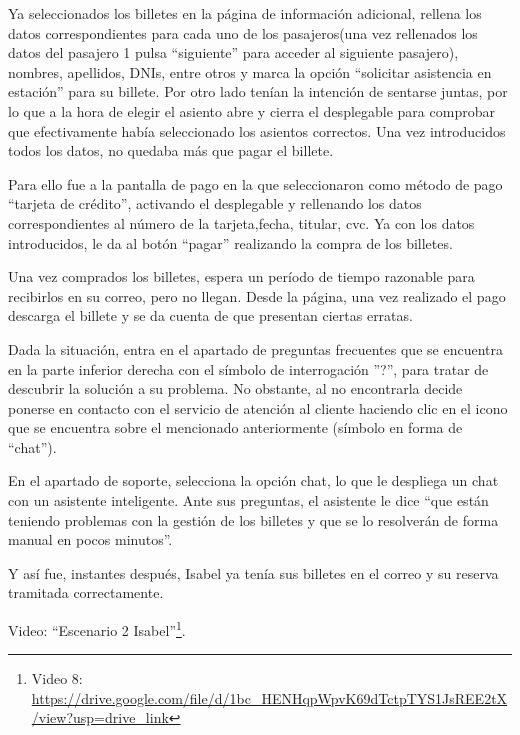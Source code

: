 Ya seleccionados los billetes en la página de información adicional, rellena los datos correspondientes para cada uno de los pasajeros(una vez rellenados los datos del pasajero 1 pulsa ``siguiente'' para acceder al siguiente pasajero), nombres, apellidos, DNIs, entre otros y marca la opción ``solicitar asistencia en estación'' para su billete.
Por otro lado tenían la intención de sentarse juntas, por lo que a la hora de elegir el asiento abre y cierra el desplegable para comprobar que efectivamente había seleccionado los asientos correctos.
Una vez introducidos todos los datos, no quedaba más que pagar el billete.

Para ello fue a la pantalla de pago en la que seleccionaron como método de pago ``tarjeta de crédito'', activando el desplegable y rellenando los datos correspondientes al número de la tarjeta,fecha, titular, cvc. Ya con los datos introducidos, le da al botón ``pagar'' realizando la compra de los billetes.

Una vez comprados los billetes, espera un período de tiempo razonable para recibirlos en su correo, pero no llegan. Desde la página, una vez realizado el pago descarga el billete y se da cuenta de que presentan ciertas erratas.

Dada la situación, entra en el apartado de preguntas frecuentes que se encuentra en la parte inferior derecha con el símbolo de interrogación ”?'', para tratar de descubrir la solución a su problema. 
No obstante, al no encontrarla decide ponerse en contacto con el servicio de atención al cliente haciendo clic en el icono que se encuentra sobre el mencionado anteriormente (símbolo en forma de ``chat'').

En el apartado de soporte, selecciona la opción chat, lo que le despliega un chat con un asistente inteligente. Ante sus preguntas, el asistente le dice ``que están teniendo problemas con la gestión de los billetes y que se lo resolverán de forma manual en pocos minutos''. 

Y así fue, instantes después, Isabel ya tenía sus billetes en el correo y su reserva tramitada correctamente.


Video: ``Escenario 2 Isabel''\footnote{Video 8: \url{https://drive.google.com/file/d/1bc_HENHqpWpvK69dTctpTYS1JsREE2tX/view?usp=drive_link}}.
